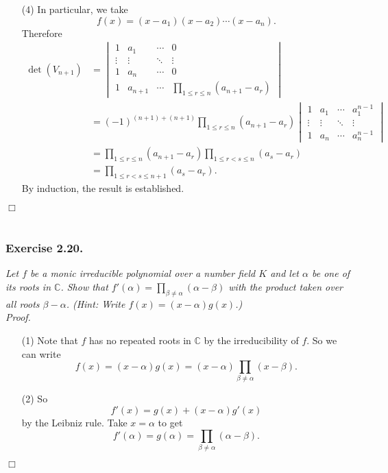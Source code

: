 \documentclass{article}
\begin{document}
\begin{enumerate}
\item[(4)]
  In particular,
  we take
  \[
    f(x) = (x - a_1)(x - a_2) \cdots (x - a_n).
  \]
  Therefore
  \begin{align*}
    \det(V_{n+1})
    &= \begin{vmatrix}
      1 & a_1 & \cdots & 0 \\
      \vdots & \vdots & \ddots & \vdots \\
      1 & a_n & \cdots & 0 \\
      1 & a_{n+1} & \cdots & \prod_{1 \leq r \leq n}(a_{n+1} - a_r)
    \end{vmatrix} \\
    &= (-1)^{(n+1)+(n+1)}\prod_{1 \leq r \leq n}(a_{n+1} - a_r)
    \begin{vmatrix}
      1 & a_1 & \cdots & a_1^{n-1} \\
      \vdots & \vdots & \ddots & \vdots \\
      1 & a_n & \cdots & a_n^{n-1}
    \end{vmatrix} \\
    &= \prod_{1 \leq r \leq n}(a_{n+1} - a_r)
        \prod_{1 \leq r < s \leq n}(a_s - a_r) \\
    &= \prod_{1 \leq r < s \leq n+1}(a_s - a_r).
  \end{align*}
  By induction, the result is established.
\end{enumerate}
$\Box$ \\\\






\subsubsection*{Exercise 2.20.}
\emph{Let $f$ be a monic irreducible polynomial over a number field $K$ and
let $\alpha$ be one of its roots in $\mathbb{C}$.
Show that $f'(\alpha) = \prod_{\beta \neq \alpha}(\alpha - \beta)$
with the product taken over all roots $\beta-\alpha$.
(Hint: Write $f(x) = (x-\alpha)g(x)$.)} \\



\emph{Proof.}
\begin{enumerate}
\item[(1)]
  Note that $f$ has no repeated roots in $\mathbb{C}$ by the irreducibility of $f$.
  So we can write
  \[
    f(x) = (x-\alpha)g(x) = (x-\alpha)\prod_{\beta \neq \alpha}(x - \beta).
  \]

\item[(2)]
  So
  \[
    f'(x) = g(x) + (x-\alpha)g'(x)
  \]
  by the Leibniz rule.
  Take $x = \alpha$ to get
  \[
    f'(\alpha) = g(\alpha) = \prod_{\beta \neq \alpha}(\alpha - \beta).
  \]
\end{enumerate}
$\Box$ \\\\
\end{document}
